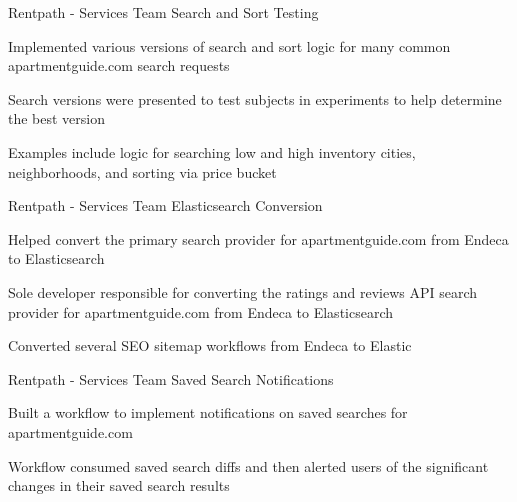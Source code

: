
\begin{cventries}

\cventry
{Rentpath - Services Team} %
{Search and Sort Testing} %
{} %
{} %
{
	\begin{cvitems} %
		\item {Implemented various versions of search and sort logic for many common apartmentguide.com search requests}   
		\item {Search versions were presented to test subjects in experiments to help determine the best version}
		\item {Examples include logic for searching low and high inventory cities, neighborhoods, and sorting via price bucket} 
		\end{cvitems}
}

\cventry
{Rentpath - Services Team} %
{Elasticsearch Conversion} %
{} %
{} %
{
	\begin{cvitems} %
		\item {Helped convert the primary search provider for apartmentguide.com from Endeca to Elasticsearch}   
		\item {Sole developer responsible for converting the ratings and reviews API search provider for apartmentguide.com from Endeca to Elasticsearch}
		\item {Converted several SEO sitemap workflows from Endeca to Elastic} 
	\end{cvitems}
}

\cventry
{Rentpath - Services Team} %
{Saved Search Notifications} %
{} %
{} %
{
	\begin{cvitems} %
		\item {Built a workflow to implement notifications on saved searches for apartmentguide.com}   
		\item {Workflow consumed saved search diffs and then alerted users of the significant changes in their saved search results}
		\end{cvitems}
}


\end{cventries}
